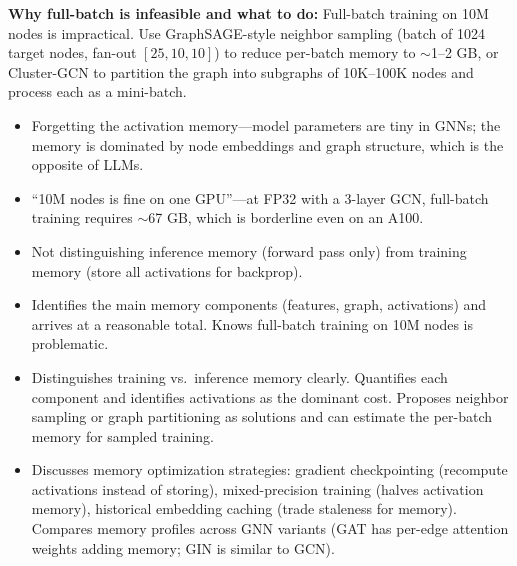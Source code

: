 \begin{interviewq}
\textbf{Why full-batch is infeasible and what to do:}
Full-batch training on 10M nodes is impractical. Use GraphSAGE-style neighbor sampling (batch of 1024 target nodes, fan-out $[25, 10, 10]$) to reduce per-batch memory to $\sim$1--2 GB, or Cluster-GCN to partition the graph into subgraphs of 10K--100K nodes and process each as a mini-batch.

\redflags
\begin{itemize}
    \item Forgetting the activation memory---model parameters are tiny in GNNs; the memory is dominated by node embeddings and graph structure, which is the opposite of LLMs.
    \item ``10M nodes is fine on one GPU''---at FP32 with a 3-layer GCN, full-batch training requires $\sim$67 GB, which is borderline even on an A100.
    \item Not distinguishing inference memory (forward pass only) from training memory (store all activations for backprop).
\end{itemize}


\goodgreat
\begin{itemize}
    \item {} Identifies the main memory components (features, graph, activations) and arrives at a reasonable total. Knows full-batch training on 10M nodes is problematic.
    \item {} Distinguishes training vs.\ inference memory clearly. Quantifies each component and identifies activations as the dominant cost. Proposes neighbor sampling or graph partitioning as solutions and can estimate the per-batch memory for sampled training.
    \item {} Discusses memory optimization strategies: gradient checkpointing (recompute activations instead of storing), mixed-precision training (halves activation memory), historical embedding caching (trade staleness for memory). Compares memory profiles across GNN variants (GAT has per-edge attention weights adding memory; GIN is similar to GCN).
\end{itemize}

\end{interviewq}

